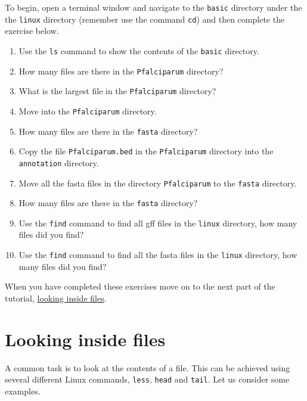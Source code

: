 \documentclass[11pt]{article}
\providecommand{\tightlist}{%
      \setlength{\itemsep}{0pt}\setlength{\parskip}{0pt}}
\begin{document}
To begin, open a terminal window and navigate to the \texttt{basic}
directory under the the \texttt{linux} directory (remember use the
command \texttt{cd}) and then complete the exercise below.

\begin{enumerate}
\def\labelenumi{\arabic{enumi}.}
\tightlist
\item
  Use the \texttt{ls} command to show the contents of the \texttt{basic}
  directory.
\item
  How many files are there in the \texttt{Pfalciparum} directory?
\item
  What is the largest file in the \texttt{Pfalciparum} directory?
\item
  Move into the \texttt{Pfalciparum} directory.
\item
  How many files are there in the \texttt{fasta} directory?
\item
  Copy the file \texttt{Pfalciparum.bed} in the \texttt{Pfalciparum}
  directory into the \texttt{annotation} directory.
\item
  Move all the fasta files in the directory \texttt{Pfalciparum} to the
  \texttt{fasta} directory.
\item
  How many files are there in the \texttt{fasta} directory?
\item
  Use the \texttt{find} command to find all gff files in the
  \texttt{linux} directory, how many files did you find?
\item
  Use the \texttt{find} command to find all the fasta files in the
  \texttt{linux} directory, how many files did you find?
\end{enumerate}

    When you have completed these exercises move on to the next part of the
tutorial, \href{files.ipynb}{looking inside files}.





\newpage





    \hypertarget{looking-inside-files}{%
\section{Looking inside files}\label{looking-inside-files}}

A common task is to look at the contents of a file. This can be achieved
using several different Linux commands, \texttt{less}, \texttt{head} and
\texttt{tail}. Let us consider some examples.
\end{document}

